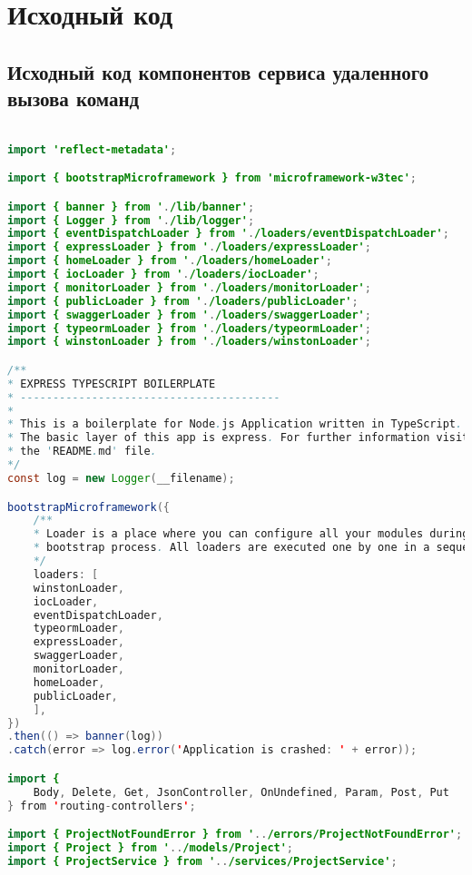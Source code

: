 %


\chapter{Исходный код} \label{app:B}

\section{Исходный код компонентов сервиса удаленного вызова команд}\label{app:B1}
\begin{lstlisting}[language=java]

import 'reflect-metadata';

import { bootstrapMicroframework } from 'microframework-w3tec';

import { banner } from './lib/banner';
import { Logger } from './lib/logger';
import { eventDispatchLoader } from './loaders/eventDispatchLoader';
import { expressLoader } from './loaders/expressLoader';
import { homeLoader } from './loaders/homeLoader';
import { iocLoader } from './loaders/iocLoader';
import { monitorLoader } from './loaders/monitorLoader';
import { publicLoader } from './loaders/publicLoader';
import { swaggerLoader } from './loaders/swaggerLoader';
import { typeormLoader } from './loaders/typeormLoader';
import { winstonLoader } from './loaders/winstonLoader';

/**
* EXPRESS TYPESCRIPT BOILERPLATE
* ----------------------------------------
*
* This is a boilerplate for Node.js Application written in TypeScript.
* The basic layer of this app is express. For further information visit
* the 'README.md' file.
*/
const log = new Logger(__filename);

bootstrapMicroframework({
	/**
	* Loader is a place where you can configure all your modules during microframework
	* bootstrap process. All loaders are executed one by one in a sequential order.
	*/
	loaders: [
	winstonLoader,
	iocLoader,
	eventDispatchLoader,
	typeormLoader,
	expressLoader,
	swaggerLoader,
	monitorLoader,
	homeLoader,
	publicLoader,
	],
})
.then(() => banner(log))
.catch(error => log.error('Application is crashed: ' + error));

import {
	Body, Delete, Get, JsonController, OnUndefined, Param, Post, Put
} from 'routing-controllers';

import { ProjectNotFoundError } from '../errors/ProjectNotFoundError';
import { Project } from '../models/Project';
import { ProjectService } from '../services/ProjectService';


\end{lstlisting}
